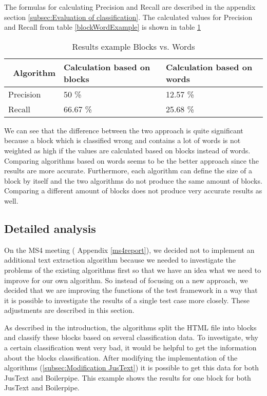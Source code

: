 The formulas for calculating Precision and Recall are described in the appendix section \ref{subsec:Evaluation of classification}.
The calculated values for Precision and Recall from table \ref{blockWordExample} is shown in table \ref{ResultsBlockWordExample}

\begin{table}[!ht]
\begin{tabular}{| p{3cm} | p{5cm} | p{5cm} | }
    \hline
    \ \textbf{Algorithm}  & \textbf{Calculation based on blocks}  & \textbf{Calculation based on words} 				\\ \hline
    Precision     & 50 \%    	&  12.57 \%	\\ \hline
    Recall & 66.67 \%    	&  25.68 \%	\\ \hline
\end{tabular}
\caption{Results example Blocks vs. Words}
\label{ResultsBlockWordExample}
\end{table}

We can see that the difference between the two approach is quite significant because a block which is classified wrong and contains a lot of words is not weighted as high if the values are calculated based on blocks instead of words. 
Comparing algorithms based on words seems to be the better approach since the results are more accurate. Furthermore, each algorithm can define the size of a block by itself and the two algorithms do not produce the same amount of blocks. Comparing a different amount of blocks does not produce very accurate results as well.  

\subsection{Detailed analysis}
\label{subsec:Detailed Analysis}


On the MS4 meeting ( Appendix \ref{ms4report}), we decided not to implement an additional text extraction algorithm because we needed to investigate the problems of the existing algorithms first so that we have an idea what we need to improve for our own algorithm. So instead of focusing on a new approach, we decided that we are improving the functions of the test framework in a way that it is possible to investigate the results of a single test case more closely. These adjustments are described in this section.

As described in the introduction, the algorithms split the HTML file into blocks and classify these blocks based on several classification data. To investigate, why a certain classification went very bad, it would be helpful to get the information about the blocks classification. After modifying the implementation of the algorithms (\ref{subsec:Modification JusText}) it is possible to get this data for both JusText and Boilerpipe. This example shows the results for one block for both JusText and Boilerpipe.


